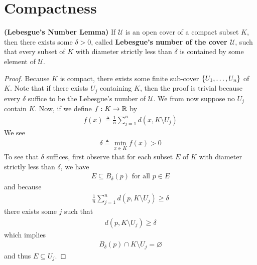 \documentclass{report}
\begin{document}
\section{Compactness}
\begin{lemma}
\label{Lebesgue's Number Lemma}
\textbf{(Lebesgue's Number Lemma)} If $\mathcal{U}$ is an open cover of a compact subset $K$, then there exists some $\delta>0$, called \textbf{Lebesgue's number of the cover $\mathcal{U}$}, such that every subset of $K$  with diameter strictly less than $\delta$ is contained by some element of $\mathcal{U}$.  
\end{lemma}
\begin{proof}
Because $K$ is compact, there exists some finite sub-cover $\{ U_1,\dots ,U_n \}$ of $K$. Note that if there exists $U_j$ containing $K$, then the proof is trivial because every $\delta$ suffice to be the Lebesgue's number of $\mathcal{U}$. We from now suppose no $U_j$ contain  $K$. Now, if we define  $f:K\rightarrow \mathbb{R}$ by 
\begin{align*}
f(x)\triangleq \frac{1}{n}\sum_{j=1}^n d(x,K \setminus U_j)
\end{align*}
We see 
\begin{align*}
\delta \triangleq \min_{x\in K}f(x)>0
\end{align*}
To see that $\delta$ suffices, first observe that for each subset $E$ of $K$ with diameter strictly less than $\delta$, we have 
 \begin{align*}
E\subseteq B_\delta (p)\text{ for all }p \in E
\end{align*}
and because 
\begin{align*}
\frac{1}{n}\sum_{j=1}^n d(p,K\setminus U_j)\geq \delta
\end{align*}
there exists some $j$ such that 
\begin{align*}
d(p,K\setminus U_j)\geq \delta
\end{align*}
which implies 
\begin{align*}
B_\delta (p)\cap  K\setminus U_j = \varnothing
\end{align*}
and thus $E\subseteq U_j$. 
\end{proof}
\end{document}
